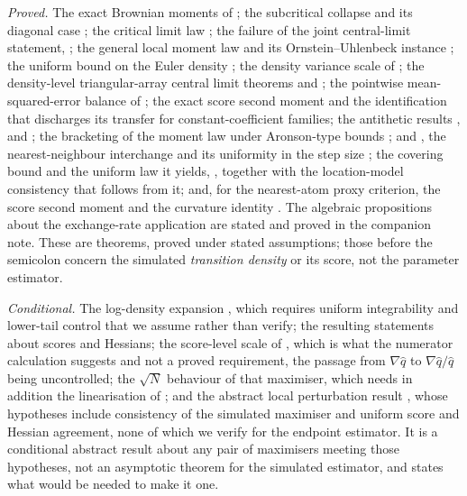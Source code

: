 \documentclass[11pt]{article}
\theoremstyle{definition}
\begin{document}
\emph{Proved.} The exact Brownian moments of ; the subcritical collapse  and its diagonal case ; the critical limit law ; the failure of the joint central-limit statement, ; the general local moment law  and its Ornstein--Uhlenbeck instance ; the uniform bound on the Euler density ; the density variance scale of ; the density-level triangular-array central limit theorems  and ; the pointwise mean-squared-error balance of ; the exact score second moment  and the identification  that discharges its transfer for constant-coefficient families; the antithetic results ,  and ; the bracketing of the moment law under Aronson-type bounds ; and ,  the nearest-neighbour interchange  and its uniformity in the step size ; the covering bound  and the uniform law it yields, , together with the location-model consistency  that follows from it; and, for the nearest-atom proxy criterion, the score second moment  and the curvature identity . The algebraic propositions about the exchange-rate application are stated and proved in the companion note. These are theorems, proved under stated assumptions; those before the semicolon concern the simulated \emph{transition density} or its score, not the parameter estimator.

\emph{Conditional.} The log-density expansion , which requires uniform integrability and lower-tail control that we assume rather than verify; the resulting statements about scores and Hessians; the score-level scale of , which is what the numerator calculation suggests and not a proved requirement, the passage from $\nabla\widehat q$ to $\nabla\widehat q/\widehat q$ being uncontrolled;  the $\sqrt N$ behaviour of that maximiser, which needs in addition the linearisation of ; and the abstract local perturbation result , whose hypotheses include consistency of the simulated maximiser and uniform score and Hessian agreement, none of which we verify for the endpoint estimator. It is a conditional abstract result about any pair of maximisers meeting those hypotheses, not an asymptotic theorem for the simulated estimator, and  states what would be needed to make it one.
\end{document}
